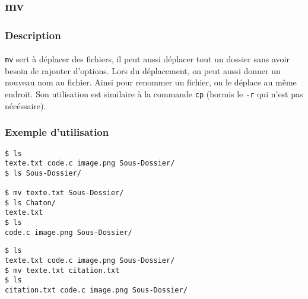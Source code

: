 \subsection{mv}

\subsubsection*{Description}

\paragraph{} \texttt{mv} sert à déplacer des fichiers, il peut aussi déplacer
tout un dossier sans avoir besoin de rajouter d'options. Lors du déplacement,
on peut aussi donner un nouveau nom au fichier. Ainsi pour renommer un fichier,
on le déplace au même endroit. Son utilisation est similaire à la commande
\texttt{cp} (hormis le \texttt{-r} qui n'est pas nécéssaire).

\subsubsection*{Exemple d'utilisation}

\begin{lstlisting}[caption=déplacement d'un fichier]
$ ls
texte.txt code.c image.png Sous-Dossier/
$ ls Sous-Dossier/

$ mv texte.txt Sous-Dossier/
$ ls Chaton/
texte.txt
$ ls
code.c image.png Sous-Dossier/
\end{lstlisting}

\begin{lstlisting}[caption=renommer un fichier]
$ ls
texte.txt code.c image.png Sous-Dossier/
$ mv texte.txt citation.txt
$ ls
citation.txt code.c image.png Sous-Dossier/
\end{lstlisting}
